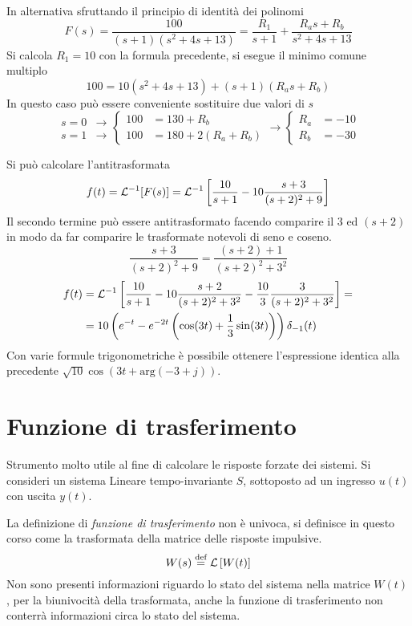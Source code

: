 In alternativa sfruttando il principio di identità dei polinomi
$$
F(s) = \frac{100}{(s+1)(s^2 + 4s + 13)} = \frac{R_1}{s+1} +
\frac{R_as+R_b}{s^2+4s+13}
$$
Si calcola $R_1=10$ con la formula precedente, si esegue il minimo comune
multiplo
$$
100 = 10(s^2+4s + 13)+(s+1)(R_as+R_b)
$$
In questo caso può essere conveniente sostituire due valori di $s$
$$
\begin{aligned}
s=0 &\rightarrow\\
s=1 &\rightarrow
\end{aligned}
\left\{
\begin{aligned}
 100 &= 130 + R_b\\
 100 &= 180 + 2(R_a + R_b)
\end{aligned}\right.
\rightarrow
\left\{
\begin{aligned}
R_a &= -10\\
R_b &= -30
\end{aligned}
\right.
$$

\newpage
Si può calcolare l'antitrasformata
$$
f(t) = \mathcal{L}^{-1} [F(s)] = \mathcal{L}^{-1} \left[
\frac{10}{s+1} -10\frac{s+3}{(s+2)^2+9}
\right]
$$
Il secondo termine può essere antitrasformato facendo comparire il $3$ ed
$(s+2)$ in modo da far comparire le trasformate notevoli di seno e coseno.
$$
\frac{s+3  }{(s+2)^2 + 9}  =\frac{(s+2)+1}{(s+2)^2 + 3^2}
$$
$$\begin{aligned}
f(t) &=
\mathcal{L}^{-1}\left[\frac{10}{s+1}-10\frac{s+2}{(s+2)^2+3^2}-\frac{10}{3}\frac{3
} {(s+2)^2 +3^2} \right] =\\
&= 10\left(e^{-t} -e^{-2t} \left( \cos(3t)+\frac{1}{3}\sin(3t) \right)
\right)\delta_{-1}(t)
\end{aligned}$$
Con varie formule trigonometriche è possibile ottenere l'espressione identica
alla precedente $\sqrt{10}\cos(3t+
\text{arg}(-3+j))$.

\newpage
\section{Funzione di trasferimento}
Strumento molto utile al fine di calcolare le risposte forzate dei sistemi.
Si consideri un sistema Lineare tempo-invariante
$S$, sottoposto ad un  ingresso $u(t)$ con uscita $y(t)$.

La definizione di \textit{funzione di trasferimento} non è univoca, si
definisce in questo corso come la trasformata della matrice delle risposte
impulsive.
$$
W(s) \stackrel{\text{def}}{=}\mathcal{L}\left[W(t)\right]
$$
Non sono presenti informazioni riguardo lo stato del sistema nella matrice
$W(t)$, per la biunivocità della trasformata, anche la funzione di
trasferimento non conterrà informazioni circa lo stato del sistema.

